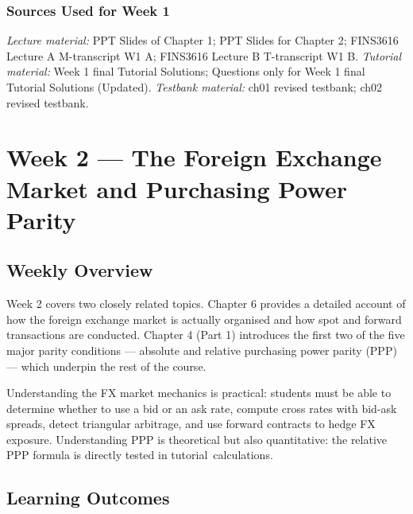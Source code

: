 \documentclass[11pt,a4paper]{article}
\begin{document}
\subsubsection*{Sources Used for Week 1}
\textit{Lecture material:} PPT Slides of Chapter 1; PPT Slides for Chapter 2; FINS3616 Lecture A M-transcript W1 A; FINS3616 Lecture B T-transcript W1 B. \textit{Tutorial material:} Week 1 final Tutorial Solutions; Questions only for Week 1 final Tutorial Solutions (Updated). \textit{Testbank material:} ch01 revised testbank; ch02 revised testbank.

\newpage

\section{Week 2 — The Foreign Exchange Market and Purchasing Power Parity}

\subsection{Weekly Overview}

Week 2 covers two closely related topics. Chapter 6 provides a detailed account of how the foreign exchange market is actually organised and how spot and forward transactions are conducted. Chapter 4 (Part 1) introduces the first two of the five major parity conditions — absolute and relative purchasing power parity (PPP) — which underpin the rest of the course.

Understanding the FX market mechanics is practical: students must be able to determine whether to use a bid or an ask rate, compute cross rates with bid-ask spreads, detect triangular arbitrage, and use forward contracts to hedge FX exposure. Understanding PPP is theoretical but also quantitative: the relative PPP formula is directly tested in tutorial~calculations.

\subsection{Learning Outcomes}
\end{document}
